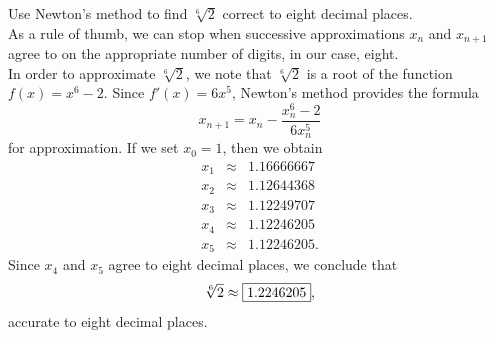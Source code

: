 \documentclass{book}
\begin{document}
\begin{Exam} Use Newton's method to find $\sqrt[6]{2}$ correct to eight decimal places.\\

As a rule of thumb, we can stop when successive approximations $x_n$ and $x_{n+1}$ agree to on the appropriate number of digits, in our case, eight.\\

In order to approximate $\sqrt[6]{2}$, we note that $\sqrt[6]{2}$ is a root of the function $f(x) = x^6-2$. Since $f'(x) = 6x^5$, Newton's method provides the formula \[x_{n+1} = x_n - \dfrac{x_n^6-2}{6x_n^5}\] for approximation. If we set $x_0 = 1$, then we obtain
\begin{eqnarray*}
x_1 &\approx& 1.16666667\\
x_2 &\approx& 1.12644368\\
x_3  &\approx& 1.12249707\\
x_4  &\approx&  1.12246205\\
x_5 &\approx& 1.12246205.
\end{eqnarray*}
 Since $x_4$ and $x_5$ agree to eight decimal places, we conclude that \[\sqrt[6]{2} \approx \fbox{$1.2246205$},\] accurate to eight decimal places. 
 \end{Exam}\vs

%
\end{document}
